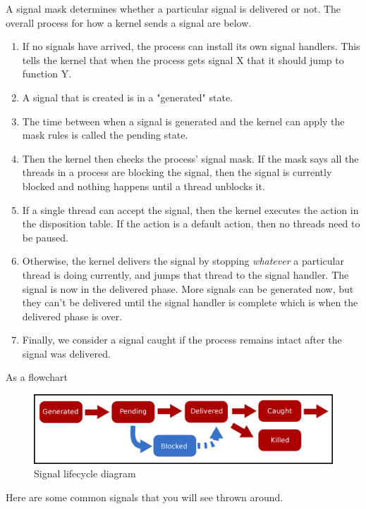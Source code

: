 A \gls{signal mask} determines whether a particular signal is delivered or not.
The overall process for how a kernel sends a signal are below.

\begin{enumerate}
\item If no signals have arrived, the process can install its own signal handlers.
  This tells the kernel that when the process gets signal X that it should jump to function Y.
\item A signal that is created is in a "generated" state.
\item The time between when a signal is generated and the kernel can apply the mask rules is called the pending state.
\item Then the kernel then checks the process' signal mask.
  If the mask says all the threads in a process are blocking the signal, then the signal is currently blocked and nothing happens until a thread unblocks it.
\item If a single thread can accept the signal, then the kernel executes the action in the disposition table.
  If the action is a default action, then no threads need to be paused.
\item Otherwise, the kernel delivers the signal by stopping \textit{whatever} a particular thread is doing currently, and jumps that thread to the signal handler.
  The signal is now in the delivered phase.
  More signals can be generated now, but they can't be delivered until the signal handler is complete which is when the delivered phase is over.
\item Finally, we consider a signal caught if the process remains intact after the signal was delivered.
\end{enumerate}

As a flowchart

\begin{figure}[H]
\centering
\includegraphics[width=.8\textwidth]{signals/drawings/signal_lifecycle.eps}
\caption{Signal lifecycle diagram}
\end{figure}

Here are some common signals that you will see thrown around.


